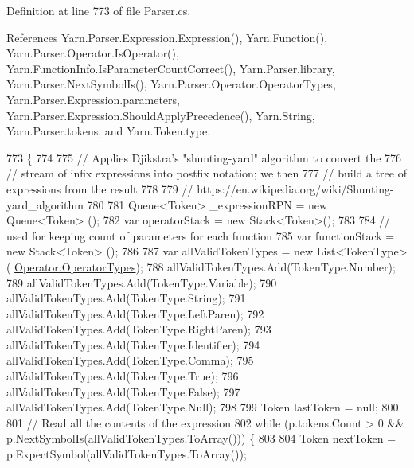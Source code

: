 Definition at line 773 of file Parser.\-cs.



References Yarn.\-Parser.\-Expression.\-Expression(), Yarn.\-Function(), Yarn.\-Parser.\-Operator.\-Is\-Operator(), Yarn.\-Function\-Info.\-Is\-Parameter\-Count\-Correct(), Yarn.\-Parser.\-library, Yarn.\-Parser.\-Next\-Symbol\-Is(), Yarn.\-Parser.\-Operator.\-Operator\-Types, Yarn.\-Parser.\-Expression.\-parameters, Yarn.\-Parser.\-Expression.\-Should\-Apply\-Precedence(), Yarn.\-String, Yarn.\-Parser.\-tokens, and Yarn.\-Token.\-type.


\begin{DoxyCode}
773                                                                          \{
774 
775                 \textcolor{comment}{// Applies Djikstra's "shunting-yard" algorithm to convert the}
776                 \textcolor{comment}{// stream of infix expressions into postfix notation; we then}
777                 \textcolor{comment}{// build a tree of expressions from the result}
778 
779                 \textcolor{comment}{// https://en.wikipedia.org/wiki/Shunting-yard\_algorithm}
780 
781                 Queue<Token> \_expressionRPN = \textcolor{keyword}{new} Queue<Token> ();
782                 var operatorStack = \textcolor{keyword}{new} Stack<Token>();
783 
784                 \textcolor{comment}{// used for keeping count of parameters for each function}
785                 var functionStack = \textcolor{keyword}{new} Stack<Token> ();
786 
787                 var allValidTokenTypes = \textcolor{keyword}{new} List<TokenType>(
      \hyperlink{a00143_ad8a4bb1b46dbc3d1b7708e78a2d97e1c}{Operator.OperatorTypes});
788                 allValidTokenTypes.Add(TokenType.Number);
789                 allValidTokenTypes.Add(TokenType.Variable);
790                 allValidTokenTypes.Add(TokenType.String);
791                 allValidTokenTypes.Add(TokenType.LeftParen);
792                 allValidTokenTypes.Add(TokenType.RightParen);
793                 allValidTokenTypes.Add(TokenType.Identifier);
794                 allValidTokenTypes.Add(TokenType.Comma);
795                 allValidTokenTypes.Add(TokenType.True);
796                 allValidTokenTypes.Add(TokenType.False);
797                 allValidTokenTypes.Add(TokenType.Null);
798 
799                 Token lastToken = null;
800 
801                 \textcolor{comment}{// Read all the contents of the expression}
802                 \textcolor{keywordflow}{while} (p.tokens.Count > 0 && p.NextSymbolIs(allValidTokenTypes.ToArray())) \{
803 
804                     Token nextToken = p.ExpectSymbol(allValidTokenTypes.ToArray());

\end{DoxyCode}
